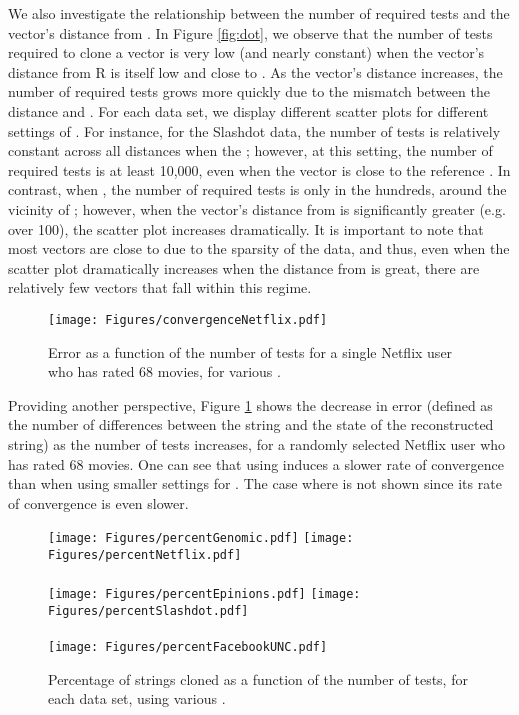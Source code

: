 \documentclass{article}
\begin{document}
We also investigate the
relationship between the number of required tests and the vector's
distance from .  In Figure \ref{fig:dot}, we observe that the number of 
tests required to clone a vector is very low (and nearly constant) 
when the vector's distance from R is itself low and close to .  As the vector's distance increases, the number 
of required tests grows more quickly due to the mismatch between the 
distance and .  For each data set,
we display different scatter plots for different settings of .  For instance,
for the Slashdot data, the number of tests is relatively constant across all distances
when the ; however, at this setting, the number of required tests is at least 10,000,
even when the vector is close to the reference .  In contrast, when , the number of required tests
is only in the hundreds, around the vicinity of ; however, when the vector's distance from  is significantly
greater (e.g. over 100), the scatter plot increases dramatically.  It is important to note that most vectors are
close to  due to the sparsity of the data, and thus, even when the scatter plot dramatically increases
when the distance from  is great, there are relatively few vectors that fall within this regime.  


\begin{figure}
\centering
\texttt{[image: Figures/convergenceNetflix.pdf]}
\caption{Error as a function of the number of tests for a single Netflix user
who has rated 68 movies, for various .}
\label{fig:convergence}
\end{figure}

Providing another perspective, Figure \ref{fig:convergence} shows the decrease in error (defined as the number of 
differences between the string and the state of the reconstructed string) as the number of 
tests increases, for a randomly selected Netflix user who has rated 68 movies.  One can 
see that using  induces a slower rate of convergence than when using smaller 
settings for .  The case where  is not shown since its rate of 
convergence is even slower.  


\begin{figure}
\centering
\quad\texttt{[image: Figures/percentGenomic.pdf]} \qquad
\texttt{[image: Figures/percentNetflix.pdf]} \\\quad \\
\texttt{[image: Figures/percentEpinions.pdf]} \qquad
\texttt{[image: Figures/percentSlashdot.pdf]} \\\quad \\
\quad\texttt{[image: Figures/percentFacebookUNC.pdf]} 
\caption{Percentage of strings cloned as a function of the number of tests, for each data set, using various .}
\label{fig:percentage}
\end{figure}
\end{document}
